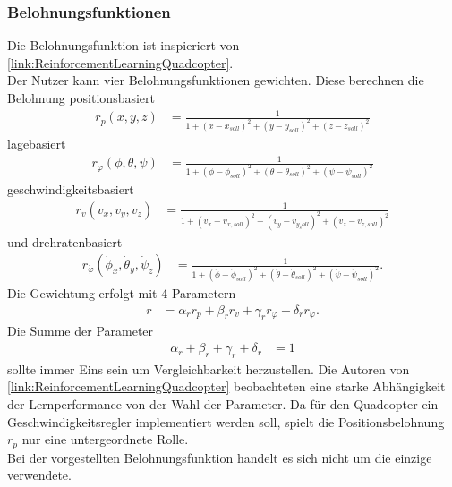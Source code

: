 \subsubsection{\label{Belohnung}Belohnungsfunktionen}
Die Belohnungsfunktion ist inspieriert von \ref{link:ReinforcementLearningQuadcopter}. \\
Der Nutzer kann vier Belohnungsfunktionen gewichten.
Diese berechnen die Belohnung positionsbasiert
\begin{align}
r_p(x, y, z) &= \frac{1}{1 + (x - x_{soll})^2 + (y - y_{soll})^2 + (z - z_{soll})^2}
\end{align}
lagebasiert
\begin{align}
r_{\varphi}(\phi, \theta, \psi) &= \frac{1}{1 + (\phi - \phi_{soll})^2 + (\theta - \theta_{soll})^2 + (\psi - \psi_{soll})^2}
\end{align}
geschwindigkeitsbasiert
\begin{align}
r_v(v_x, v_y, v_z) &= \frac{1}{1 + (v_x - v_{x, soll})^2 + (v_y - v_{y_soll})^2 + (v_z - v_{z, soll})^2}
\end{align}
und drehratenbasiert
\begin{align}
r_{\dot{\varphi}}(\dot{\phi}_x, \dot{\theta}_y, \dot{\psi}_z) &= \frac{1}{1 + (\dot{\phi} - \dot{\phi}_{soll})^2 + (\dot{\theta} - \dot{\theta}_{soll})^2 + (\dot{\psi} - \dot{\psi}_{soll})^2}.
\end{align}
Die Gewichtung erfolgt mit 4 Parametern 
\begin{align}
r &= \alpha_r r_p + \beta_r r_v + \gamma_r r_{\varphi} + \delta_r r_{\dot{\varphi}}.
\end{align}
Die Summe der Parameter
\begin{align}
\alpha_r + \beta_r + \gamma_r + \delta_r &= 1 
\end{align}
sollte immer Eins sein um Vergleichbarkeit herzustellen.
Die Autoren von \ref{link:ReinforcementLearningQuadcopter} beobachteten eine starke Abhängigkeit der Lernperformance von der Wahl der Parameter. Da für den Quadcopter ein Geschwindigkeitsregler implementiert werden soll, spielt die Positionsbelohnung $r_p$ nur eine untergeordnete Rolle.\\
Bei der vorgestellten Belohnungsfunktion handelt es sich nicht um die einzige verwendete.


